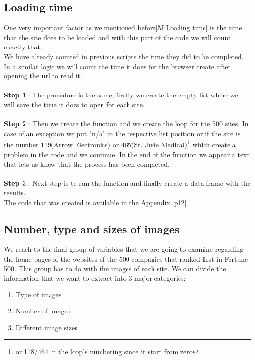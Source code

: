 \documentclass{book}
\begin{document}
\subsection{Loading time}
One very important factor as we mentioned before\ref{M:Loading time} is the time that the site does to be loaded and with this part of the code we will count exactly that.\\
We have already counted in previous scripts the time they did to be completed. In a similar logic we will count the time it does for the browser create after opening the url to read it.\\\\
\textbf{Step 1} : The procedure is the same, firstly we create the empty list where we will save the time it does to open for each site. \\\\
\textbf{Step 2} : Then we create the function and we create the loop for the 500 sites. In case of an exception we put "n/a" in the respective list position or if the site is the number 119(Arrow Electronics) or 465(St. Jude Medical)\footnote{or 118/464 in the loop's numbering since it start from zero} which create a problem in the code and we continue. In the end of the function we appear a text that lets us know that the process has been completed.\\\\
\textbf{Step 3} : Next step is to run the function and finally create a data frame with the results.\\
The code that was created is available in the Appendix.\ref{p12}

\subsection{Number, type and sizes of images}
We reach to the final group of variables that we are going to examine regarding the home pages of the websites of the 500 companies that ranked first in Fortune 500. This group has to do with the images of each site. We can divide the information that we want to extract into 3 major categories:
\begin{enumerate}
\item Type of images
\item Number of images
\item Different image sizes
\end{enumerate}
\end{document}
